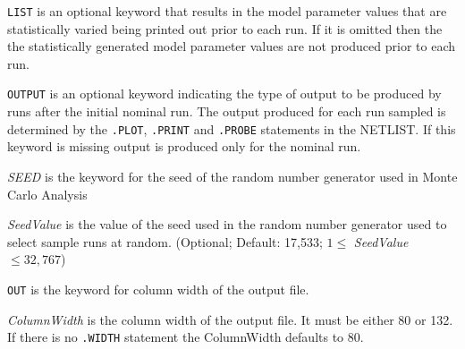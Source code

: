 {\begin{widelist}
\end{widelist}

\begin{widelist}
\item[{\tt LIST}] is an optional keyword that results in the model parameter
                  values that are statistically varied
                  being printed out prior to each run. If it is omitted
          then the the statistically generated model parameter
          values are not produced prior to each run.


\item[{\tt OUTPUT}] is an optional keyword indicating the type of output to
                  be produced by runs after the initial nominal run. The
          output produced for each run sampled is determined by the
          {\tt .PLOT}, {\tt .PRINT} and {\tt .PROBE} statements in
          the NETLIST. If this keyword is missing output is produced
          only for the nominal run.



\item[{\it SEED}] is the keyword for the seed of the random number generator
                  used in Monte Carlo Analysis

\item[{\it SeedValue}] is the value of the seed used in the random number
generator used to select sample runs at random.
    (Optional; Default: 17,533; $1 \le$ {\it SeedValue}$ \le 32,767$)

\end{widelist}


} %

%
%


\begin{widelist}
\item[{\tt OUT}] is the keyword for column width of the output file.
\item[{\it ColumnWidth}] is the column width of the output file.
                 It must be either 80 or 132.  If there is no {\tt .WIDTH}
                 statement the ColumnWidth defaults to 80.
\end{widelist}

